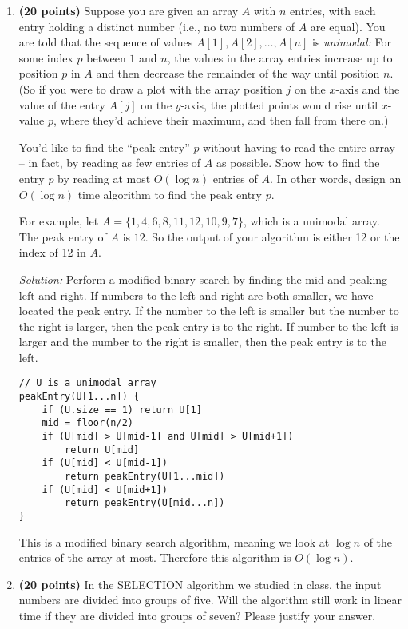 \documentclass[11pt]{article}
\begin{document}
\begin{enumerate}

\item
{\bf (20 points)}
Suppose you are given an array $A$ with $n$ entries, with each entry
holding a distinct number (i.e., no two numbers of $A$ are
		equal). You are told that the sequence of
		values $A[1], A[2], \ldots, A[n]$ is {\em unimodal:} For some
		index $p$ between $1$ and $n$, the values in the array entries
		increase up to position $p$ in $A$ and then decrease the
		remainder of the way until position $n$. (So if you were to
		draw a plot with the array position $j$ on the $x$-axis and
		the value of the entry $A[j]$ on the $y$-axis, the plotted
		points would rise until $x$-value $p$, where they'd achieve
		their maximum, and then fall from there on.)


You'd like to find the ``peak entry'' $p$ without having to read the entire array -- in fact, by reading as few entries of $A$ as possible. Show how to find
the entry $p$ by reading at most $O(\log n)$ entries of $A$. In other words, design an $O(\log n)$ time algorithm to find the peak entry $p$.

For example, let $A=\{1, 4, 6, 8, 11, 12, 10, 9, 7\}$, which is a unimodal array. The peak entry of $A$ is $12$. So the output of your algorithm is either 12 or the index of 12 in $A$.

\textit{Solution:} Perform a modified binary search by finding the mid and peaking left and right. If numbers to the left and right are both smaller, we have located the peak entry. If the number to the left is smaller but the number to the right is larger, then the peak entry is to the right. If number to the left is larger and the number to the right is smaller, then the peak entry is to the left.
\begin{verbatim}
// U is a unimodal array
peakEntry(U[1...n]) {
    if (U.size == 1) return U[1]
    mid = floor(n/2)
    if (U[mid] > U[mid-1] and U[mid] > U[mid+1])
        return U[mid]
    if (U[mid] < U[mid-1])
        return peakEntry(U[1...mid])
    if (U[mid] < U[mid+1])
        return peakEntry(U[mid...n])
}
\end{verbatim}
This is a modified binary search algorithm, meaning we look at $\log n$ of the entries of the array at most. Therefore this algorithm is $O(\log n)$.

\item
{\bf (20 points)}
In the SELECTION algorithm we studied in class, the input numbers are divided into groups of five. Will the algorithm still work in linear time if they are divided into groups of seven? Please justify your answer.


\end{enumerate}
\end{document}

